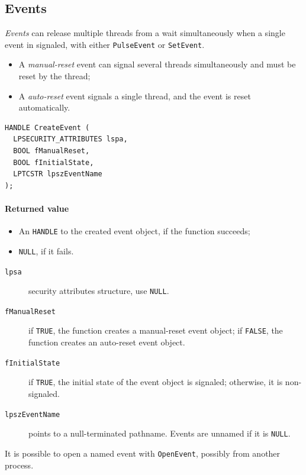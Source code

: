 \subsection{Events}
\emph{Events} can release multiple threads from a wait simultaneously when a single event in signaled, with either \texttt{PulseEvent} or \texttt{SetEvent}.

\begin{itemize}
\item A \textit{manual-reset} event can signal several threads simultaneously and must be reset by the thread;
\item A \textit{auto-reset} event signals a single thread, and the event is reset automatically.
\end{itemize}

\begin{verbatim}
HANDLE CreateEvent (
  LPSECURITY_ATTRIBUTES lspa,
  BOOL fManualReset,
  BOOL fInitialState,
  LPTCSTR lpszEventName
);
\end{verbatim}

\paragraph{Returned value}
\begin{itemize}
\item An \texttt{HANDLE} to the created event object, if the function succeeds;
\item \texttt{NULL}, if it fails.
\end{itemize}

\begin{description}
\item [\texttt{lpsa}] security attributes structure, use \texttt{NULL}.
\item [\texttt{fManualReset}] if \texttt{TRUE}, the function creates a manual-reset event object; if \texttt{FALSE}, the function creates an auto-reset event object.
\item [\texttt{fInitialState}] if \texttt{TRUE}, the initial state of the event object is signaled; otherwise, it is non-signaled.
\item [\texttt{lpszEventName}] points to a null-terminated pathname. Events are unnamed if it is \texttt{NULL}.
\end{description}
It is possible to open a named event with \texttt{OpenEvent}, possibly from another process.

